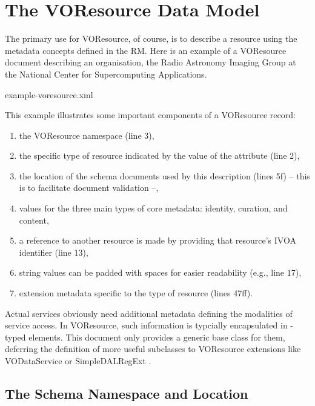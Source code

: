 \documentclass[11pt,a4paper]{ivoa}
\begin{document}
\section{The VOResource Data Model}
\label{sect:model}

The primary use for VOResource, of course, is to describe a resource
using the metadata concepts defined in the RM.  Here is an example of a
VOResource document describing an organisation, the Radio Astronomy
Imaging Group at the National Center for Supercomputing Applications.  


   {example-voresource.xml}

This example illustrates some important components of a VOResource
record:

\begin{enumerate}
  \item the VOResource namespace (line 3),
  \item the specific type of resource indicated by
       the value of the  attribute (line 2),
  \item the location of the schema documents used by
       this description (lines 5f) -- this is to facilitate document
       validation --,
  \item values for the three main types of core metadata:
       identity, curation, and content,
  \item a reference to another resource is made by
       providing that resource's IVOA identifier (line 13),
  \item string values can be padded with spaces
       for easier readability (e.g., line 17),
  \item extension metadata specific to the type of
       resource (lines 47ff).
\end{enumerate}

Actual services obviously need additional metadata defining the
modalities of service access. In VOResource, such information
is typcially encapsulated in -typed elements. This
document only provides a generic base class for them, deferring the
definition of more useful subclasses to VOResource extensions like
VODataService \citep{2010ivoa.spec.1202P} or SimpleDALRegExt
\citep{2013ivoa.spec.1125P}.


\subsection{The Schema Namespace and Location}
\end{document}
